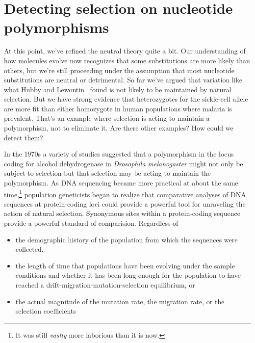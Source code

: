 \chapter{Detecting selection on nucleotide polymorphisms}

At this point, we've refined the neutral theory quite a bit. Our
understanding of how molecules evolve now recognizes that some
substitutions are more likely than others, but we're still proceeding
under the assumption that most nucleotide substitutions are neutral or
detrimental. So far we've argued that variation like what Hubby and
Lewontin~\cite{Hubby-Lewontin66,Lewontin-Hubby66} found is not likely
to be maintained by natural selection. But we have strong evidence
that heterozygotes for the sickle-cell allele are more fit than either
homozygote in human populations where malaria is prevalent. That's an
example where selection is acting to maintain a polymorphism, not to
eliminate it. Are there other examples? How could we detect them?

In the 1970s a variety of studies suggested that a polymorphism in the
locus coding for alcohol dehydrogenase in {\it Drosophila
  melanogaster\/} might not only be subject to selection but that
selection may be acting to maintain the polymorphism. As DNA
sequencing became more practical at about the same time,\footnote{It
  was still {\it vastly\/} more laborious than it is now.} population
geneticists began to realize that comparative analyses of DNA
sequences at protein-coding loci could provide a powerful tool for
unraveling the action of natural selection. Synonymous sites within a
protein-coding sequence provide a powerful standard of
comparision. Regardless of

\begin{itemize}

\item the demographic history of the population from which the
  sequences were collected,

\item the length of time that populations have been evolving under the
  sample conditions and whether it has been long enough for the
  population to have reached a drift-migration-mutation-selection
  equilibrium, or

\item the actual magnitude of the mutation rate, the migration rate,
  or the selection coefficients

\end{itemize}

